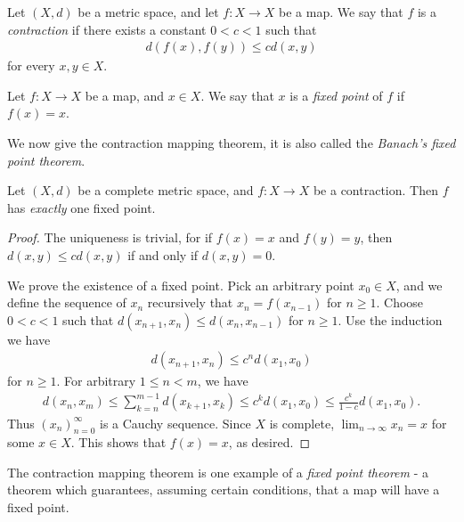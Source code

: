 \begin{definition}[Contraction]
    Let $(X, d)$ be a metric space, and  let $f : X \to X$ be a map. We say that $f$ is a \emph{contraction} if there exists a constant $0 < c < 1$ such that
    \begin{align*}
        d(f(x), f(y)) \leq cd(x, y)
    \end{align*}
    for every $x, y \in X$.
\end{definition}

\begin{definition}
    Let $f : X \to X$ be a map, and $x \in X$. We say that $x$ is a \emph{fixed point} of $f$ if $f(x) = x$.
\end{definition}

We now give the contraction mapping theorem, it is also called the \emph{Banach's fixed point theorem}.

\begin{theorem}
    Let $(X, d)$ be a complete metric space, and $f : X \to X$ be a contraction. Then $f$ has \emph{exactly} one fixed point.
\end{theorem}

\begin{proof}
    The uniqueness is trivial, for if $f(x) = x$ and $f(y) = y$, then $d(x, y) \leq cd(x, y)$ if and only if $d(x, y) = 0$.

    We prove the existence of a fixed point. Pick an arbitrary point $x_0 \in X$, and we define the sequence of $x_n$ recursively that $x_{n} = f(x_{n - 1})$ for $n \geq 1$. Choose $0 < c < 1$ such that $d(x_{n + 1}, x_{n}) \leq d(x_{n}, x_{n - 1})$ for $n \geq 1$. Use the induction we have
        \begin{align*}
            d(x_{n + 1}, x_{n}) \leq c^nd(x_1, x_0)
        \end{align*}
    for $n \geq 1$. For arbitrary $1 \leq n < m$, we have
        \begin{align*}
            d(x_n, x_m)
            \leq \sum_{k = n}^{m - 1}d(x_{k + 1}, x_k)
            \leq c^{k}d(x_1, x_0)
            \leq \frac{c^k}{1 - c}d(x_1, x_0).
        \end{align*}
    Thus $(x_n)_{n = 0}^{\infty}$ is a Cauchy sequence. Since $X$ is complete, $\lim_{n \to \infty}x_n = x$ for some $x \in X$. This shows that $f(x) = x$, as desired.
\end{proof}

\begin{remark}
    The contraction mapping theorem is one example of a \emph{fixed point theorem} - a theorem which guarantees, assuming certain conditions, that a map will have a fixed point.
\end{remark}



